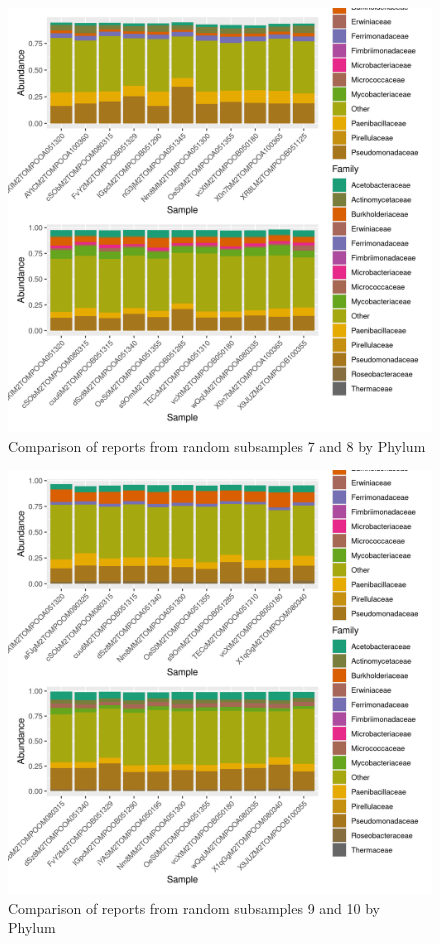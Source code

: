 \documentclass{article}
\begin{document}
\begin{figure}
\centering
\includegraphics[scale=0.8]{otus_centrales_tomate_aleatorio1_7.csv_otus_centrales_tomate_aleatorio1_8.csv_relative_abundance_Family.png}
\caption{Comparison of reports from random subsamples 7 and 8 by Phylum}
\end{figure}


\begin{figure}
\centering
\includegraphics[scale=0.8]{otus_centrales_tomate_aleatorio1_1.csv_otus_centrales_tomate_aleatorio1_2.csv_relative_abundance_Family.png}
\caption{Comparison of reports from random subsamples 9 and 10 by Phylum}
\end{figure}
\end{document}
